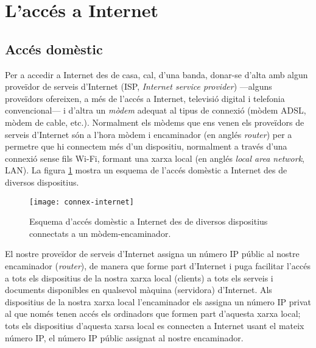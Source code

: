 


\section{L'accés a Internet}
\label{ss:adaI}

\subsection{Accés domèstic}
Per a accedir a Internet des de casa, cal, d'una banda, donar-se
d'alta amb algun proveïdor de serveis d'Internet (ISP, \emph{Internet
  service provider}) ---alguns proveïdors ofereixen, a més de l'accés
a Internet, televisió digital i telefonia convencional--- i d'altra un
\emph{mòdem} adequat al tipus de connexió (mòdem ADSL, mòdem de cable,
etc.). Normalment els mòdems que ens venen els proveïdors de serveis
d'Internet són a l'hora mòdem i encaminador (en anglés \emph{router})
per a permetre que hi connectem més d'un dispositiu, normalment a
través d'una connexió sense fils Wi-Fi, formant una xarxa local (en
anglés \emph{local area network}, LAN). La figura
\ref{fg:accesinternet} mostra un esquema de l'accés domèstic a
Internet des de diversos dispositius.

\begin{figure}
\centering
\texttt{[image: connex-internet]}
\caption{Esquema d'accés domèstic a Internet des de diversos
  dispositius connectats a un mòdem-encaminador.}
\label{fg:accesinternet}
\end{figure}

El nostre proveïdor de serveis d'Internet assigna un número IP públic
al nostre encaminador (\emph{router}), de manera que forme part
d'Internet i puga facilitar l'accés a tots els dispositius de la
nostra xarxa local (clients) a tots els serveis i documents
disponibles en qualsevol màquina (servidora) d'Internet. Als
dispositius de la nostra xarxa local l'encaminador els assigna un
número IP privat al que només tenen accés els ordinadors que formen
part d'aquesta xarxa local; tots els dispositius d'aquesta xarsa local
es connecten a Internet usant el mateix número IP, el número IP públic
assignat al nostre encaminador.

